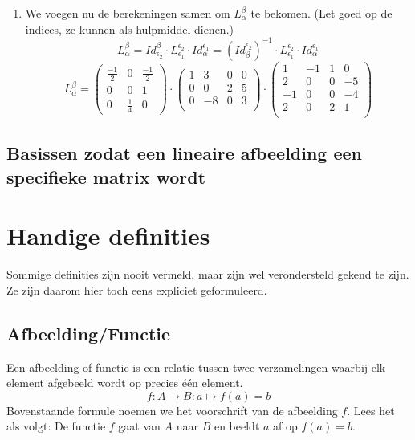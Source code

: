 \documentclass[lineaire_algebra_oplossingen.tex]{subfiles}
\begin{document}
\begin{enumerate}
\item
We voegen nu de berekeningen samen om $L_{\alpha}^{\beta}$ te bekomen. (Let goed op de indices, ze kunnen als hulpmiddel dienen.)
\[
L_{\alpha}^{\beta}
= Id_{\epsilon_2}^{\beta} \cdot L_{\epsilon_1}^{\epsilon_2} \cdot Id_{\alpha}^{\epsilon_1} 
= (Id_{\beta}^{\epsilon_2})^{-1} \cdot L_{\epsilon_1}^{\epsilon_2} \cdot Id_{\alpha}^{\epsilon_1} 
\]
\[
L_{\alpha}^{\beta} = 
\begin{pmatrix}
\frac{-1}{2} & 0 & \frac{-1}{2}\\
0 & 0 & 1\\
0 & \frac{1}{4} & 0
\end{pmatrix}
\cdot
\begin{pmatrix}
1 & 3 & 0 & 0\\
0 & 0 & 2 & 5\\
0 & -8 &0 & 3\\
\end{pmatrix}
\cdot 
\begin{pmatrix}
1 & -1 & 1 & 0\\
2 & 0 & 0 & -5\\
-1 & 0 & 0 & -4\\
2 & 0 & 2 & 1\\
\end{pmatrix}
\]

\end{enumerate}

\section{Basissen zodat een lineaire afbeelding een specifieke matrix wordt}
\label{specifieke_basissen_voor_lineaire_afbeelding}



\chapter{Handige definities}
Sommige definities zijn nooit vermeld, maar zijn wel verondersteld gekend te zijn. Ze zijn daarom hier toch eens expliciet geformuleerd.

\section{Afbeelding/Functie}
\label{afbeelding}
Een afbeelding of functie is een relatie tussen twee verzamelingen waarbij elk element afgebeeld wordt op precies \'e\'en element.
\[
f : A \rightarrow B : a \mapsto f(a)=b
\]
Bovenstaande formule noemen we het voorschrift van de afbeelding $f$.
Lees het als volgt:
De functie $f$ gaat van $A$ naar $B$ en beeldt $a$ af op $f(a)=b$.
\end{document}
